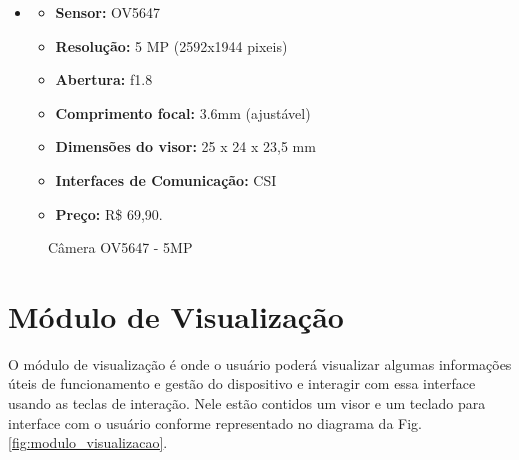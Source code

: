     \begin{itemize}
    	\item[] 
    	\begin{itemize}
     		\item \textbf{Sensor:} OV5647
    		\item \textbf{Resolução:} 5 MP (2592x1944 pixeis)
    		\item \textbf{Abertura:} f1.8
    		\item \textbf{Comprimento focal:} 3.6mm (ajustável)
    		\item \textbf{Dimensões do visor:} 25 x 24 x 23,5 mm
    		\item \textbf{Interfaces de Comunicação:} CSI
    		\item \textbf{Preço:} R\$ 69,90.
    	\end{itemize}
    \end{itemize}
    
    \begin{figure}[H]
    \centering
    \hspace{0.1\textwidth}
    \caption{Câmera OV5647 - 5MP}\label{fig:camera_process}
    \end{figure}
    
\section{Módulo de Visualização}
    
    O módulo de visualização é onde o usuário poderá visualizar algumas informações úteis de funcionamento e gestão do dispositivo e interagir com essa interface usando as teclas de interação. Nele estão contidos um visor e um teclado para interface com o usuário conforme representado no diagrama da Fig. \ref{fig:modulo_visualizacao}.
    
